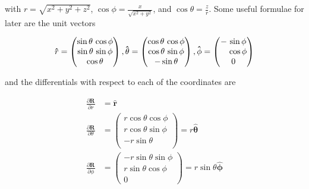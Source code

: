 with $r = \sqrt{x^2 + y^2 + z^2}$, $\cos\phi = \frac{x}{\sqrt{x^2 + y^2}}$, and $\cos\theta = \frac{z}{r}$.
Some useful formulae for later are the unit vectors

\begin{equation}
	\mathbf{\hat{\text{${r}$}}} =
	\begin{pmatrix}
		\sin\theta \, \cos\phi \\
		\sin\theta \, \sin\phi \\
		\cos\theta             \\
	\end{pmatrix},
	\mathbf{\hat{\text{$\theta$}}} =
	\begin{pmatrix}
		\cos\theta \, \cos\phi \\
		\cos\theta \, \sin\phi \\
		-\sin\theta            \\
	\end{pmatrix},
	\mathbf{\hat{\text{$\phi$}}} =
	\begin{pmatrix}
		-\, \sin\phi             \\
		\hphantom{-} \, \cos\phi \\
		0                        \\
	\end{pmatrix}
\end{equation}

and the differentials with respect to each of the coordinates are

\begin{equation}
	\begin{aligned}
		\frac{\partial\mathbf{R}}{\partial r}      & = \mathbf{\hat{\text{${r}$}}} \\
		\frac{\partial\mathbf{R}}{\partial \theta} & =
		\begin{pmatrix}
			r \cos\theta \cos\phi \\
			r \cos\theta \sin\phi \\
			-r \sin\theta         \\
		\end{pmatrix}
		= r\mathbf{\hat{\text{$\theta$}}}                                          \\
		\frac{\partial\mathbf{R}}{\partial \phi}   & =
		\begin{pmatrix}
			-r \sin\theta \sin\phi \\
			r \sin\theta \cos\phi  \\
			0
		\end{pmatrix}
		= r \sin\theta \mathbf{\hat{\text{$\phi$}}}
	\end{aligned}
\end{equation}

